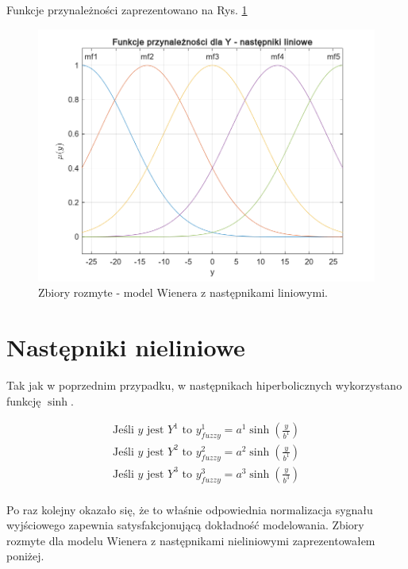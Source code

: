Funkcje przynależności zaprezentowano na Rys. \ref{WienerfuzzySets_liniowe}

\begin{figure}[h!]
\centering
\includegraphics[width=\textwidth]{pictures/WienerfuzzySets_liniowe}
\caption{Zbiory rozmyte - model Wienera z następnikami liniowymi.}
\label{WienerfuzzySets_liniowe}
\end{figure}

\newpage

\section{Następniki nieliniowe}
Tak jak w poprzednim przypadku, w następnikach hiperbolicznych wykorzystano funkcję $\sinh$. 

\begin{equation}
\begin{array}{c}
\text{Jeśli } y \text{ jest } Y^1 \text{ to } y^1_{fuzzy}=a^1\sinh \left({\frac{y}{b^1}}\right) \\
\text{Jeśli } y \text{ jest } Y^2 \text{ to } y^2_{fuzzy}=a^2\sinh \left({\frac{y}{b^1}}\right) \\
\text{Jeśli } y \text{ jest } Y^3 \text{ to } y^3_{fuzzy}=a^3\sinh \left({\frac{y}{b^3}}\right) \\
\end{array}
\end{equation}

Po raz kolejny okazało się, że to właśnie odpowiednia normalizacja sygnału wyjściowego zapewnia satysfakcjonującą dokładność modelowania. Zbiory rozmyte dla modelu Wienera z następnikami nieliniowymi zaprezentowałem poniżej.

